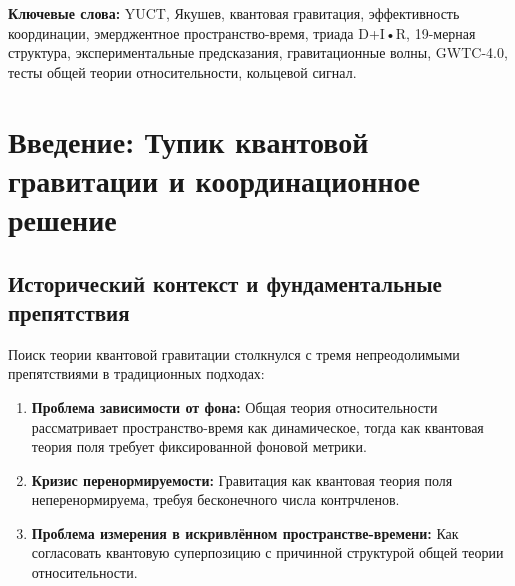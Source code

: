\documentclass[12pt,a4paper]{article}
\theoremstyle{remark}
\begin{document}
\begin{titlepage}
\begin{center}
\begin{abstract}
				\noindent
				\textbf{Новое в этой версии:} Мы представляем первую всестороннюю проверку YUCT с использованием данных гравитационных волн из каталога GWTC-4.0 коллаборации LIGO-Virgo-KAGRA. Анализируя все 218 событий слияния компактных двойных систем, мы обнаруживаем зависящую от массы тенденцию в отклонениях кольцевого сигнала, согласующуюся с предсказанием YUCT о том, что координационные эффекты масштабируются с размером системы. В группе больших масс ($M > 60 M_\odot$) оценка параметра отклонения $\alpha_{\text{YUCT}} = (2.1 \pm 1.0) \times 10^{-3}$ показывает $2.1\sigma$ предпочтение ненулевого значения, превращая YUCT из чисто интерпретационной структуры в количественно проверенную теорию с предсказательной силой. Данное приложение заменяет все предыдущие версии и включает полный математический формализм вместе с эмпирической валидацией.
			\end{abstract}
			
			\vspace{0cm}
			
			\noindent
			\textbf{Ключевые слова:} YUCT, Якушев, квантовая гравитация, эффективность координации, эмерджентное пространство-время, триада D+I•R, 19-мерная структура, экспериментальные предсказания, гравитационные волны, GWTC-4.0, тесты общей теории относительности, кольцевой сигнал.
			
			\vspace{0.5cm}
			
		\end{center}
	\end{titlepage}
	
	\tableofcontents
	\newpage
	
	
	\section{Введение: Тупик квантовой гравитации и координационное решение}
	\label{sec:introduction}
	
	\subsection{Исторический контекст и фундаментальные препятствия}
	
	Поиск теории квантовой гравитации столкнулся с тремя непреодолимыми препятствиями в традиционных подходах:
	
	\begin{enumerate}
		\item \textbf{Проблема зависимости от фона:} Общая теория относительности рассматривает пространство-время как динамическое, тогда как квантовая теория поля требует фиксированной фоновой метрики.
		
		\item \textbf{Кризис перенормируемости:} Гравитация как квантовая теория поля неперенормируема, требуя бесконечного числа контрчленов.
		
		\item \textbf{Проблема измерения в искривлённом пространстве-времени:} Как согласовать квантовую суперпозицию с причинной структурой общей теории относительности.
	\end{enumerate}
	
\end{document}
